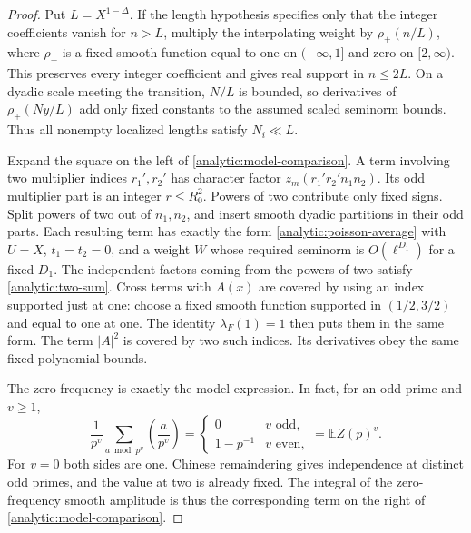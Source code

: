 \begin{proof}
Put $L=X^{1-\Delta}$. If the length hypothesis specifies only that
the integer coefficients vanish for $n>L$, multiply the interpolating
weight by $\rho_+(n/L)$, where $\rho_+$ is a fixed smooth function equal
to one on $(-\infty,1]$ and zero on $[2,\infty)$. This preserves every
integer coefficient and gives real support in $n\leq2L$. On a dyadic
scale meeting the transition, $N/L$ is bounded, so derivatives of
$\rho_+(Ny/L)$ add only fixed constants to the assumed scaled seminorm
bounds. Thus all nonempty localized lengths satisfy $N_i\ll L$.

Expand the square on the left of \eqref{analytic:model-comparison}.
A term involving two multiplier indices $r_1',r_2'$ has character
factor $z_m(r_1'r_2'n_1n_2)$. Its odd multiplier part is an integer
$r\leq R_0^2$. Powers of two contribute only fixed signs. Split
powers of two out of $n_1,n_2$, and insert smooth dyadic partitions
in their odd parts. Each resulting term has exactly the form
\eqref{analytic:poisson-average} with $U=X$, $t_1=t_2=0$, and a
weight $W$ whose required seminorm is $O(\ell^{D_1})$ for a fixed
$D_1$. The independent factors coming from the powers of two satisfy
\eqref{analytic:two-sum}. Cross terms with $A(x)$ are covered by
using an index supported just at one: choose a fixed smooth function
supported in $(1/2,3/2)$ and equal to one at one. The identity
$\lambda_F(1)=1$ then puts them in the same form. The term $|A|^2$
is covered by two such indices. Its derivatives obey the same
fixed polynomial bounds.

The zero frequency is exactly the model expression. In fact, for
an odd prime and $v\geq1$,
\[
 \frac1{p^v}\sum_{a\bmod p^v}\left(\frac a{p^v}\right)
 =\begin{cases}0&v\text{ odd},\\1-p^{-1}&v\text{ even},\end{cases}
 =\mathbb E Z(p)^v.
\]
For $v=0$ both sides are one. Chinese remaindering gives independence
at distinct odd primes, and the value at two is already fixed.
The integral of the zero-frequency smooth amplitude is thus the
corresponding term on the right of
\eqref{analytic:model-comparison}.


\end{proof}
